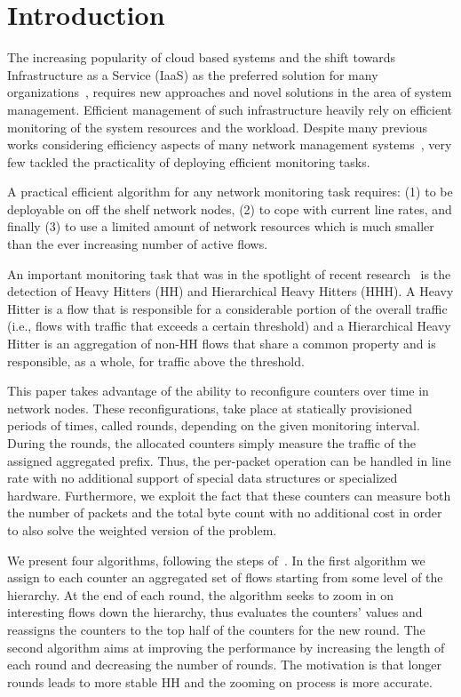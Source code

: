 \section{Introduction}
The increasing popularity of cloud based systems and the shift towards Infrastructure as a Service (IaaS)  as the preferred  solution for many organizations~\cite{Goyal2013}, requires new approaches and novel solutions in the area of system  management. Efficient management of such infrastructure heavily rely  on  efficient monitoring of the system resources and the workload. Despite many previous works considering efficiency aspects of many network management systems~\cite{devoflow, microte, anomaly}, very few tackled the practicality of deploying efficient monitoring tasks.

A practical efficient algorithm for any network monitoring task requires: (1) to be deployable on off the shelf network nodes, (2) to cope with current line rates, and finally (3) to use a limited amount of network resources which is much smaller than the ever increasing number of active flows.

An important monitoring task that was in the spotlight of recent research~\cite{ben2016heavy, basat2017optimal, ben2017constant, sivaraman2017heavy, HHHOnline, tong2015high} is the detection of Heavy Hitters (HH) and Hierarchical Heavy Hitters (HHH). A Heavy Hitter is a flow that is responsible for a considerable portion of the  overall traffic (i.e., flows with traffic that exceeds a certain threshold) and a Hierarchical Heavy Hitter is an aggregation of non-HH flows that share a common property and is responsible, as a whole, for traffic above the threshold.

This paper takes advantage of the ability to reconfigure counters over time in network nodes. These reconfigurations, take place at statically provisioned periods of times, called rounds, depending on the given monitoring interval.
During the rounds, the allocated counters simply measure the traffic of the assigned aggregated prefix. Thus, the per-packet operation can be handled in line rate with no additional support of special data structures or specialized hardware. Furthermore, we exploit the fact that these counters can measure both the number of packets and the total byte count with no additional cost in order to also solve the weighted version of the problem.

We present four algorithms, following the steps of~\cite{conf/sigcomm/YuanCM07,Moraney2016,moraney2018}.  In the first algorithm we assign to each counter an aggregated set of flows starting from some level of the hierarchy. At the end of each round, the algorithm seeks to zoom in on interesting flows down the hierarchy,  thus evaluates the counters' values and reassigns the counters to the top half of the counters for the new round. The second algorithm aims at improving the performance by increasing the length of each round and decreasing the number of rounds. The motivation is that longer rounds leads to more stable HH and the zooming on process is more accurate.

